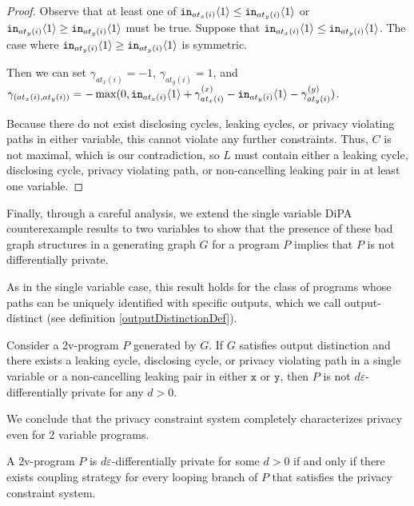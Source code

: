 \begin{proof}
    Observe that at least one of $\texttt{in}_{at_x(i)}\langle1 \rangle\leq \texttt{in}_{at_y(i)}\langle1 \rangle$ or $\texttt{in}_{at_y(i)}\langle1 \rangle\geq \texttt{in}_{at_y(i)}\langle1 \rangle$ must be true. Suppose that $\texttt{in}_{at_x(i)}\langle1 \rangle\leq \texttt{in}_{at_y(i)}\langle1 \rangle$. The case where $\texttt{in}_{at_y(i)}\langle1 \rangle\geq \texttt{in}_{at_y(i)}\langle1 \rangle$ is symmetric. 

    Then we can set $\gamma_{at_x(i)} = -1$, $\gamma_{at_y(i)}=1$, and $\gamma_{(at_x(i), at_y(i))} =  -\max(0, \texttt{in}_{at_x(i)}\langle1 \rangle+ \gamma_{at_x(i)}^{(x)}-\texttt{in}_{at_y(i)}\langle1 \rangle-\gamma_{at_y(i)}^{(y)})$. 
    
    Because there do not exist disclosing cycles, leaking cycles, or privacy violating paths in either variable, this cannot violate any further constraints. Thus, $C$ is not maximal, which is our contradiction, so $L$ must contain either a leaking cycle, disclosing cycle, privacy violating path, or non-cancelling leaking pair in at least one variable.
\end{proof}

Finally, through a careful analysis, we extend the single variable DiPA counterexample results to two variables to show that the presence of these bad graph structures in a generating graph $G$ for a program $P$ implies that $P$ is not differentially private. 

As in the single variable case, this result holds for the class of programs whose paths can be uniquely identified with specific outputs, which we call output-distinct (see definition \ref{outputDistinctionDef}).


\begin{lemma}
    Consider a 2v-program $P$ generated by $G$. If $G$ satisfies output distinction and there exists a leaking cycle, disclosing cycle, or privacy violating path in a single variable or a non-cancelling leaking pair in either $\texttt{x}$ or $\texttt{y}$, then $P$ is not $d\varepsilon$-differentially private for any $d>0$. 
\end{lemma}

We conclude that the privacy constraint system completely characterizes privacy even for 2 variable programs.

\begin{thm}
    A 2v-program $P$ is $d\varepsilon$-differentially private for some $d>0$ if and only if there exists coupling strategy for every looping branch of $P$ that satisfies the privacy constraint system.
\end{thm}

